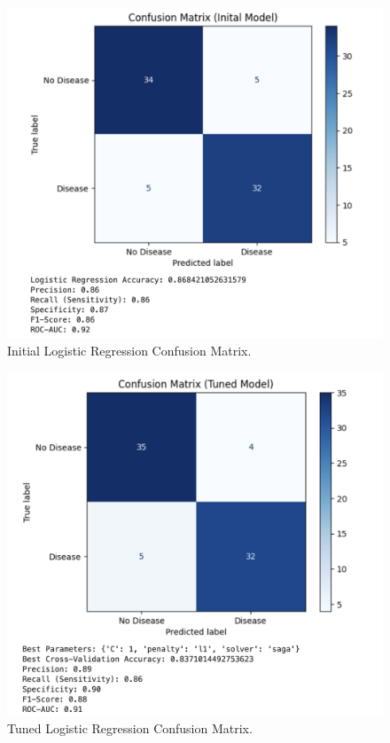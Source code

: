 \begin{figure}[htbp]
    \centerline{\includegraphics[scale=0.2]{img/Confusion Matrix Inital.png}}
    \caption{Initial Logistic Regression Confusion Matrix.}\label{Initial Logistic Regression Confusion Matrix}
\end{figure}

\begin{figure}[htbp]
    \centerline{\includegraphics[scale=0.2]{img/Confusion Matrix Tuned Model.png}}
    \caption{Tuned Logistic Regression Confusion Matrix.}\label{Tuned Logistic Regression Confusion Matrix}
\end{figure}


